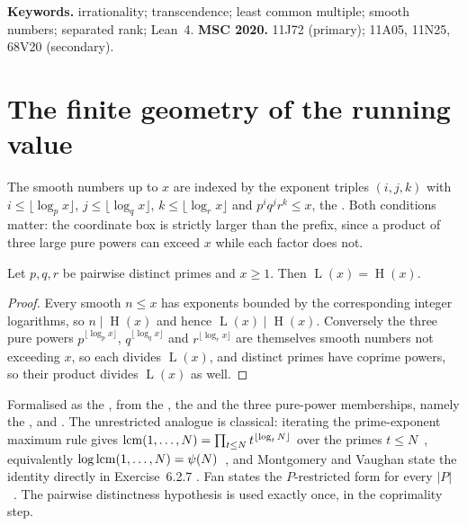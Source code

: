 \documentclass[11pt]{article}
\newcommand{\hgt}{\operatorname{H}}
\newcommand{\Lprefix}{\operatorname{L}}
\begin{document}
\medskip
\noindent\textbf{Keywords.} irrationality; transcendence; least common
multiple; smooth numbers; separated rank; Lean~4.
\qquad
\textbf{MSC 2020.} 11J72 (primary); 11A05, 11N25, 68V20 (secondary).

\section{The finite geometry of the running value}\label{long269:sec:lcm}

The smooth numbers up to $x$ are indexed by the exponent triples $(i,j,k)$ with
$i\le\lfloor\log_p x\rfloor$, $j\le\lfloor\log_q x\rfloor$,
$k\le\lfloor\log_r x\rfloor$ and $p^{i}q^{j}r^{k}\le x$, the
.  Both conditions matter: the coordinate box is strictly
larger than the prefix, since a product of three large pure powers can exceed
$x$ while each factor does not.

\begin{theorem}\label{long269:res:lcm}
Let $p,q,r$ be pairwise distinct primes and $x\ge1$.  Then
$\Lprefix(x)=\hgt(x)$.
\end{theorem}

\begin{proof}
Every smooth $n\le x$ has exponents bounded by the corresponding integer
logarithms, so $n\mid\hgt(x)$ and hence $\Lprefix(x)\mid\hgt(x)$.  Conversely
the three pure powers $p^{\lfloor\log_p x\rfloor}$,
$q^{\lfloor\log_q x\rfloor}$ and $r^{\lfloor\log_r x\rfloor}$ are themselves
smooth numbers not exceeding $x$, so each divides $\Lprefix(x)$, and distinct
primes have coprime powers, so their product divides $\Lprefix(x)$ as well.
\end{proof}

\noindent Formalised as the
, from the
, the
 and the three pure-power memberships, namely the
,
and
.
The unrestricted analogue is classical: iterating the prime-exponent maximum
rule gives $\operatorname{lcm}(1,\ldots,N)=\prod_{t\le N}t^{\lfloor\log_t N\rfloor}$ over the
primes $t\le N$~\cite[Ex.~1.21(a), p.~22]{apostol1976}, equivalently
$\log\operatorname{lcm}(1,\ldots,N)=\psi(N)$~\cite[\S4.2, p.~75]{apostol1976}, and
Montgomery and Vaughan state the identity directly in Exercise~6.2.7
\cite[p.~183]{montgomeryvaughan2007}.  Fan states the $P$-restricted form for
every $|P|$~\cite{fan2026comment}.  The pairwise distinctness hypothesis is
used exactly once, in the coprimality step.
\end{document}
